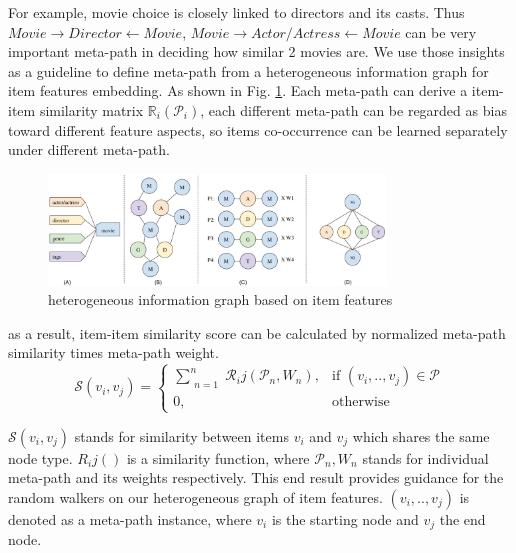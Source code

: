 For example, movie choice is closely linked to directors and its casts. Thus $Movie \rightarrow Director \leftarrow Movie$, $Movie \rightarrow Actor/Actress \leftarrow Movie$  can be very important meta-path in deciding how similar 2 movies are. We use those insights as a guideline to define meta-path from a heterogeneous information graph for item features embedding. As shown in Fig. \ref{fig:fe-graph}.
Each meta-path can derive a item-item similarity matrix $\mathbb{R}_i(\mathcal{P}_i)$, each different meta-path can be regarded as bias toward different feature aspects, so items co-occurrence can be learned separately under different meta-path.

\begin{figure}[!t]
    \centering
    \includegraphics[width=0.8\textwidth]{figs/fig1.png}
    \caption{heterogeneous information graph based on item features}\label{fig:fe-graph}
\end{figure}

as a result, item-item similarity score can be calculated by normalized meta-path similarity times meta-path weight.
\begin{equation}\label{itemsim}
    \mathcal{S}(v_i,v_j) = 
    \begin{cases}
         \sum\limits_{\substack{n=1}}^{n} \mathcal{R}_ij(\mathcal{P}_n,{W_n}),& \text{if } (v_{i}, .., v_{j}) \in \mathcal{P} \\
         0,              & \text{otherwise}
     \end{cases}
\end{equation}

$\mathcal{S}(v_i,v_j)$ stands for similarity between items $v_i$ and $v_j$ which shares the same node type. $R_ij()$ is a similarity function, where $\mathcal{P}_n, {W_n}$ stands for individual meta-path and its weights respectively. This end result provides guidance for the random walkers on our heterogeneous graph of item features. $(v_{i}, .., v_{j})$ is denoted as a meta-path instance, where $v_i$ is the starting node and $v_j$ the end node.

